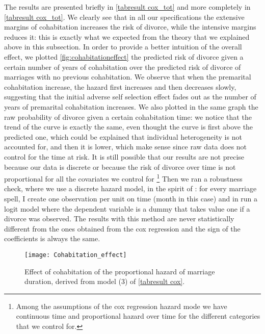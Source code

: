 \documentclass[12pt]{article}
\begin{document}
 The results are presented briefly in \autoref{tabresult cox_tot} and more completely in \autoref{tabresult cox_tot}. We clearly see that in all our specifications the extensive margins of cohabitation increases the risk of divorce, while the intensive margins reduces it: this is exactly what we expected from the theory that we explained above in this subsection. In order to provide a better intuition of the overall effect, we plotted \autoref{fig:cohabitationeffect} the predicted risk of divorce given a certain number of years of cohabitation over the predicted risk of divorce of marriages with no previous cohabitation. We observe that when the premarital cohabitation increase, the hazard first increases and then decreases slowly, suggesting that the initial adverse self selection effect fades out as the number of years of premarital cohabitation increases. We also plotted in the same graph the raw probability of divorce given a certain cohabitation time: we notice that the trend of the curve is exactly the same, even thought the curve is first above the predicted one, which could be explained that individual heterogeneity is not accounted for, and then it is lower, which make sense since raw data does not control for the time at risk. It is still possible that our results are not precise because our data is discrete or because the risk of divorce over time is not proportional for all the covariates we control for \footnote{Among the assumptions of the cox regression hazard mode we have continuous time and proportional hazard over time for the different categories that we control for.} Then we ran a robustness check, where we use a discrete hazard model, in the spirit of \citet{jenkins1995}: for every marriage spell, I create one observation per unit on time (month in this case) and in run a logit model where the dependent variable is a dummy that takes value one if a divorce was observed. The results with this method are never statistically different from the ones obtained from the cox regression and the sign of the coefficients is always the same.\\
\begin{figure}[H]
	\centering
	\texttt{[image: Cohabitation\_effect]}
	\caption{Effect of cohabitation of the proportional hazard of marriage duration, derived from model (3) of \autoref{tabresult cox}.}
	\label{fig:cohabitationeffect}
\end{figure}
\end{document}
